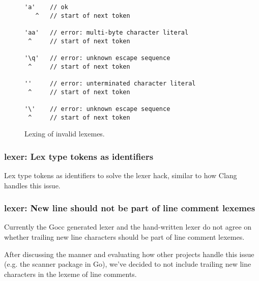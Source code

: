 \begin{figure}[htbp]
	\centering
\begin{BVerbatim}
'a'    // ok
   ^   // start of next token

'aa'   // error: multi-byte character literal
 ^     // start of next token

'\q'   // error: unknown escape sequence
 ^     // start of next token

''     // error: unterminated character literal
 ^     // start of next token

'\'    // error: unknown escape sequence
 ^     // start of next token
\end{BVerbatim}
	\caption{Lexing of invalid lexemes.}
	\label{fig:invalid_lexemes}
\end{figure}

\subsubsection{lexer: Lex type tokens as identifiers}


Lex type tokens as identifiers to solve the lexer hack, similar to how Clang handles this issue.

\subsubsection{lexer: New line should not be part of line comment lexemes}


Currently the Gocc generated lexer and the hand-written lexer do not agree on whether trailing new line characters should be part of line comment lexemes.

After discussing the manner and evaluating how other projects handle this issue (e.g. the scanner package in Go), we've decided to not include trailing new line characters in the lexeme of line comments.

